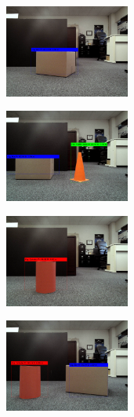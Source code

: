\begin{figure}[H]
    \centering
    \begin{subfigure}[]
        \centering
        \includegraphics[width=0.45\textwidth]{Images/Box_d100cm.PNG}
    \end{subfigure}
    \begin{subfigure}[]
        \centering
        \includegraphics[width=0.45\textwidth]{Images/box_d120cm_py_d105cm.PNG}
    \end{subfigure}
    \begin{subfigure}[]
        \centering
        \includegraphics[width=0.45\textwidth]{Images/cy_d80cm.PNG}
    \end{subfigure}
    \begin{subfigure}[]
        \centering
        \includegraphics[width=0.45\textwidth]{Images/cy_d85cm_box_d95cm.PNG}

\end{subfigure}
\end{figure}
